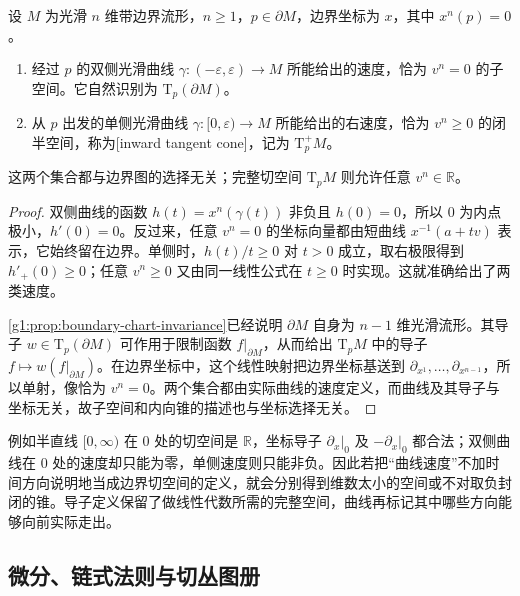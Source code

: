 \begin{proposition}
	\label{g1:prop:boundary-velocities}
	设 \(M\) 为光滑 \(n\) 维带边界流形，\(n\ge1\)，\(p\in\partial M\)，边界坐标为 \(x\)，其中 \(x^n(p)=0\)。
	\begin{enumerate}
		\item 经过 \(p\) 的双侧光滑曲线 \(\gamma:(-\varepsilon,\varepsilon)\to M\) 所能给出的速度，恰为 \(v^n=0\) 的子空间。它自然识别为 \(\mathrm{T}_p(\partial M)\)。
		\item 从 \(p\) 出发的单侧光滑曲线 \(\gamma:[0,\varepsilon)\to M\) 所能给出的右速度，恰为 \(v^n\ge0\) 的闭半空间，称为[inward tangent cone]，记为 \(\mathrm{T}_p^+M\)。
	\end{enumerate}
	这两个集合都与边界图的选择无关；完整切空间 \(\mathrm{T}_pM\) 则允许任意 \(v^n\in\mathbb R\)。
\end{proposition}
\begin{proof}
	双侧曲线的函数 \(h(t)=x^n(\gamma(t))\) 非负且 \(h(0)=0\)，所以 \(0\) 为内点极小，\(h'(0)=0\)。反过来，任意 \(v^n=0\) 的坐标向量都由短曲线 \(x^{-1}(a+tv)\) 表示，它始终留在边界。单侧时，\(h(t)/t\ge0\) 对 \(t>0\) 成立，取右极限得到 \(h'_+(0)\ge0\)；任意 \(v^n\ge0\) 又由同一线性公式在 \(t\ge0\) 时实现。这就准确给出了两类速度。

	\cref{g1:prop:boundary-chart-invariance}已经说明 \(\partial M\) 自身为 \(n-1\) 维光滑流形。其导子 \(w\in \mathrm{T}_p(\partial M)\) 可作用于限制函数 \(f|_{\partial M}\)，从而给出 \(\mathrm{T}_pM\) 中的导子 \(f\mapsto w(f|_{\partial M})\)。在边界坐标中，这个线性映射把边界坐标基送到 \(\partial_{x^1},\ldots,\partial_{x^{n-1}}\)，所以单射，像恰为 \(v^n=0\)。两个集合都由实际曲线的速度定义，而曲线及其导子与坐标无关，故子空间和内向锥的描述也与坐标选择无关。
\end{proof}



例如半直线 \([0,\infty)\) 在 \(0\) 处的切空间是 \(\mathbb R\)，坐标导子 \(\partial_x|_0\) 及 \(-\partial_x|_0\) 都合法；双侧曲线在 \(0\) 处的速度却只能为零，单侧速度则只能非负。因此若把“曲线速度”不加时间方向说明地当成边界切空间的定义，就会分别得到维数太小的空间或不对取负封闭的锥。导子定义保留了做线性代数所需的完整空间，曲线再标记其中哪些方向能够向前实际走出。

\subsection{微分、链式法则与切丛图册}
\label{g1:subsec:1102:03}

